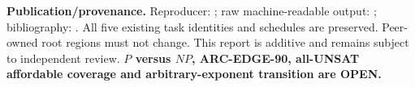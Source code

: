 \documentclass[11pt]{article}
\begin{document}
\textbf{Publication/provenance.} Reproducer: ; raw machine-readable output: ; bibliography: . All five existing task identities and schedules are preserved. Peer-owned root regions must not change. This report is additive and remains subject to independent review. \textbf{$P$ versus $NP$, ARC-EDGE-90, all-UNSAT affordable coverage and arbitrary-exponent transition are OPEN.}



\end{document}
